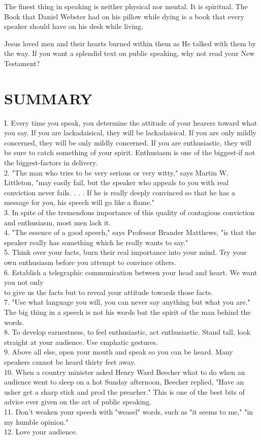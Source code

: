 \documentclass[10pt]{article}
\begin{document}
The finest thing in speaking is neither physical nor mental. It is spiritual. The Book that Daniel Webster had on his pillow while dying is a book that every speaker should have on his desk while living.

Jesus loved men and their hearts burned within them as He talked with them by the way. If you want a splendid text on public speaking, why not read your New Testament?

\section*{SUMMARY}
I. Every time you speak, you determine the attitude of your hearers toward what you say. If you are lackadaisical, they will be lackadaisical. If you are only mildly concerned, they will be only mildly concerned. If you are enthusiastic, they will be sure to catch something of your spirit. Enthusiasm is one of the biggest-if not the biggest-factors in delivery.\\
2. "The man who tries to be very serious or very witty," says Martin W. Littleton, "may easily fail, but the speaker who appeals to you with real conviction never fails. . . . If he is really deeply convinced so that he has a message for you, his speech will go like a flame."\\
3. In spite of the tremendous importance of this quality of contagious conviction and enthusiasm, most men lack it.\\
4. "The essence of a good speech," says Professor Brander Matthews, "is that the speaker really has something which he really wants to say."\\
5. Think over your facts, burn their real importance into your mind. Try your own enthusiasm before you attempt to convince others.\\
6. Establish a telegraphic communication between your head and heart. We want you not only\\
to give us the facts but to reveal your attitude towards those facts.\\
7. "Use what language you will, you can never say anything but what you are." The big thing in a speech is not his words but the spirit of the man behind the words.\\
8. To develop earnestness, to feel enthusiastic, act enthusiastic. Stand tall, look straight at your audience. Use emphatic gestures.\\
9. Above all else, open your mouth and speak so you can be heard. Many speakers cannot be heard thirty feet away.\\
10. When a country minister asked Henry Ward Beecher what to do when an audience went to sleep on a hot Sunday afternoon, Beecher replied, "Have an usher get a sharp stick and prod the preacher." This is one of the best bits of advice ever given on the art of public speaking.\\
11. Don't weaken your speech with "weasel" words, such as "it seems to me," "in my humble opinion."\\
12. Love your audience.
\end{document}
